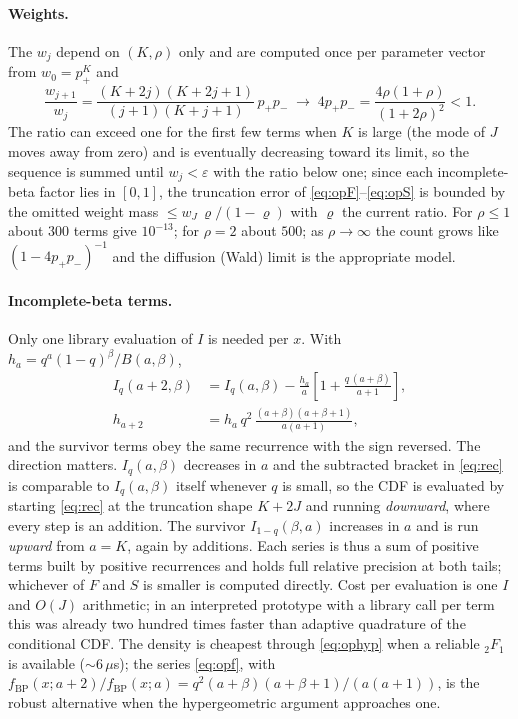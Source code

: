 \documentclass[11pt]{article}
\newcommand{\Ireg}{I}
\begin{document}
\paragraph{Weights.} The $w_j$ depend on $(K,\rho)$ only and are computed once per parameter vector from $w_0=p_+^K$ and
\begin{equation}
\frac{w_{j+1}}{w_j}=\frac{(K+2j)(K+2j+1)}{(j+1)(K+j+1)}\,p_+p_-\;\longrightarrow\;4p_+p_-=\frac{4\rho(1+\rho)}{(1+2\rho)^2}<1 .
\end{equation}
The ratio can exceed one for the first few terms when $K$ is large (the mode of $J$ moves away from zero) and is eventually decreasing toward its limit, so the sequence is summed until $w_j<\varepsilon$ with the ratio below one; since each incomplete-beta factor lies in $[0,1]$, the truncation error of \eqref{eq:opF}--\eqref{eq:opS} is bounded by the omitted weight mass $\le w_{J}\,\varrho/(1-\varrho)$ with $\varrho$ the current ratio. For $\rho\le1$ about $300$ terms give $10^{-13}$; for $\rho=2$ about $500$; as $\rho\to\infty$ the count grows like $(1-4p_+p_-)^{-1}$ and the diffusion (Wald) limit is the appropriate model.

\paragraph{Incomplete-beta terms.} Only one library evaluation of $\Ireg$ is needed per $x$. With $h_a=q^{a}(1-q)^{\beta}/B(a,\beta)$,
\begin{align}
\Ireg_q(a+2,\beta)&=\Ireg_q(a,\beta)-\frac{h_a}{a}\left[1+\frac{q\,(a+\beta)}{a+1}\right],
\label{eq:rec}\\
h_{a+2}&=h_a\,q^2\,\frac{(a+\beta)(a+\beta+1)}{a(a+1)},
\end{align}
and the survivor terms obey the same recurrence with the sign reversed. The direction matters. $\Ireg_q(a,\beta)$ decreases in $a$ and the subtracted bracket in \eqref{eq:rec} is comparable to $\Ireg_q(a,\beta)$ itself whenever $q$ is small, so the CDF is evaluated by starting \eqref{eq:rec} at the truncation shape $K+2J$ and running \emph{downward}, where every step is an addition. The survivor $\Ireg_{1-q}(\beta,a)$ increases in $a$ and is run \emph{upward} from $a=K$, again by additions. Each series is thus a sum of positive terms built by positive recurrences and holds full relative precision at both tails; whichever of $F$ and $S$ is smaller is computed directly. Cost per evaluation is one $\Ireg$ and $O(J)$ arithmetic; in an interpreted prototype with a library call per term this was already two hundred times faster than adaptive quadrature of the conditional CDF. The density is cheapest through \eqref{eq:ophyp} when a reliable ${}_2F_1$ is available ($\sim6\,\mu$s); the series \eqref{eq:opf}, with $f_{\mathrm{BP}}(x;a+2)/f_{\mathrm{BP}}(x;a)=q^2(a+\beta)(a+\beta+1)/(a(a+1))$, is the robust alternative when the hypergeometric argument approaches one.
\end{document}
